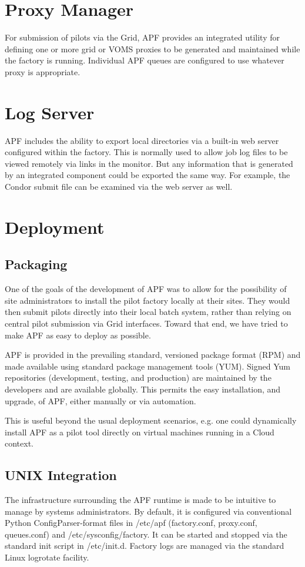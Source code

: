 \documentclass[a4paper]{jpconf}
\begin{document}
\section{Proxy Manager}

For submission of pilots via the Grid, APF provides an integrated utility for
defining one or more grid or VOMS proxies to be generated and maintained while
the factory is running. Individual APF queues are configured to use whatever
proxy is appropriate. 


\section{Log Server}

APF includes the ability to export local directories via a built-in web server
configured within the factory. This is normally used to allow job log files to
be viewed remotely via links in the monitor. But any information that is
generated by an integrated component could be exported the same way. For
example, the Condor submit file can be examined via the web server as well. 


\section{Deployment}

\subsection{Packaging}
One of the goals of the development of APF was to allow for the possibility of
site administrators to install the pilot factory locally at their sites. They
would then submit pilots directly into their local batch system, rather than
relying on central pilot submission via Grid interfaces. Toward that end, we
have tried to make APF as easy to deploy as possible. 

APF is provided in the prevailing standard, versioned package format (RPM) and
made available using standard package management tools (YUM). Signed Yum
repositories (development, testing, and production) are maintained by the
developers and are available globally. This permits the easy installation, and
upgrade, of APF, either manually or via automation. 

This is useful beyond the usual deployment scenarios, e.g. one could dynamically
install APF as a pilot tool directly on virtual machines running in a Cloud
context. 

\subsection{UNIX Integration}
The infrastructure surrounding the APF runtime is made to be intuitive to
manage by systems administrators. By default, it is configured via conventional
Python ConfigParser-format files in /etc/apf (factory.conf, proxy.conf,
queues.conf) and /etc/sysconfig/factory. It can be started and stopped via the
standard init script in /etc/init.d. Factory logs are managed via the standard
Linux logrotate facility. 
\end{document}
